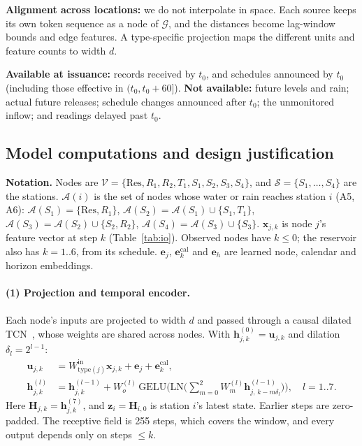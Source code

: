 \documentclass[11pt,a4paper]{article}
\newcommand{\A}{\mathcal{A}}
\newcommand{\Res}{\mathrm{Res}}
\begin{document}
\textbf{Alignment across locations:} we do not interpolate in space. Each
source keeps its own token sequence as a node of $\mathcal{G}$, and the
distances become lag-window bounds and edge features. A type-specific
projection maps the different units and feature counts to width $d$.

\textbf{Available at issuance:} records received by $t_0$, and schedules
announced by $t_0$ (including those effective in $(t_0,t_0+60]$).
\textbf{Not available:} future levels and rain; actual future releases;
schedule changes announced after $t_0$; the unmonitored inflow; and readings
delayed past $t_0$.

\subsection{Model computations and design justification}\label{sec:model}
\textbf{Notation.} Nodes are
$\mathcal{V}=\{\Res,R_1,R_2,T_1,S_1,S_2,S_3,S_4\}$, and
$\mathcal{S}=\{S_1,\dots,S_4\}$ are the stations. $\A(i)$ is the set of nodes
whose water or rain reaches station $i$ (A5, A6):
$\A(S_1)=\{\Res,R_1\}$, $\A(S_2)=\A(S_1)\cup\{S_1,T_1\}$,
$\A(S_3)=\A(S_2)\cup\{S_2,R_2\}$, $\A(S_4)=\A(S_3)\cup\{S_3\}$.
$\mathbf{x}_{j,k}$ is node $j$'s feature vector at step $k$
(Table~\ref{tab:io}). Observed nodes have $k\le0$; the reservoir also has
$k=1..6$, from its schedule. $\mathbf{e}_j$, $\mathbf{e}^{\mathrm{cal}}_k$ and
$\mathbf{e}_h$ are learned node, calendar and horizon embeddings.

\paragraph{(1) Projection and temporal encoder.} Each node's inputs are
projected to width $d$ and passed through a causal dilated TCN~\cite{tcn},
whose weights are shared across nodes. With
$\mathbf{h}^{(0)}_{j,k}=\mathbf{u}_{j,k}$ and dilation $\delta_l=2^{l-1}$:
\begin{equation}
\begin{aligned}
  \mathbf{u}_{j,k} &= W^{\mathrm{in}}_{\mathrm{type}(j)}\mathbf{x}_{j,k} + \mathbf{e}_j + \mathbf{e}^{\mathrm{cal}}_k,\\
  \mathbf{h}^{(l)}_{j,k} &= \mathbf{h}^{(l-1)}_{j,k}
  + W^{(l)}_{o}\,\mathrm{GELU}\Big(\mathrm{LN}\Big(\textstyle\sum_{m=0}^{2}
     W^{(l)}_{m}\mathbf{h}^{(l-1)}_{j,\,k-m\delta_l}\Big)\Big),\quad l=1..7.
\end{aligned}
  \label{eq:tcn}
\end{equation}
Here $\mathbf{H}_{j,k}=\mathbf{h}^{(7)}_{j,k}$, and
$\mathbf{z}_i=\mathbf{H}_{i,0}$ is station $i$'s latest state. Earlier steps
are zero-padded. The receptive field is 255 steps, which covers the window,
and every output depends only on steps $\le k$.
\end{document}
